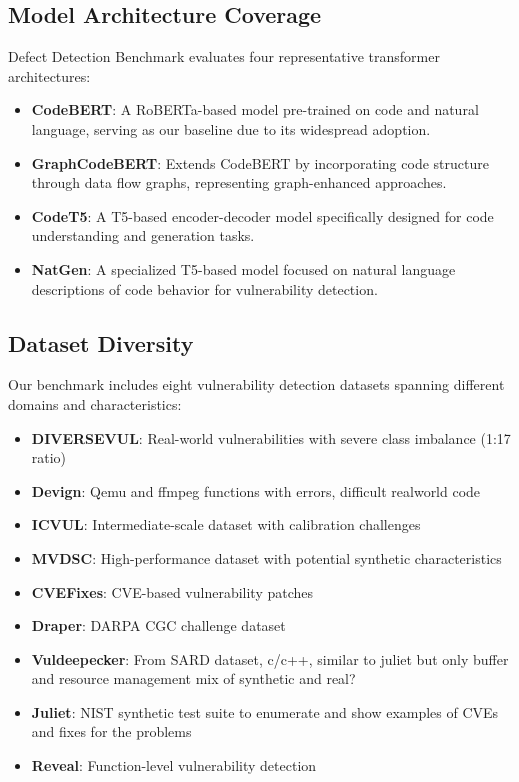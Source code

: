 \documentclass[letterpaper]{article}
\begin{document}
\subsection{Model Architecture Coverage}
Defect Detection Benchmark evaluates four representative transformer architectures:

\begin{itemize}
	\item \textbf{CodeBERT}: A RoBERTa-based model pre-trained on code and natural language, serving as our baseline due to its widespread adoption.

	\item \textbf{GraphCodeBERT}: Extends CodeBERT by incorporating code structure through data flow graphs, representing graph-enhanced approaches.

	\item \textbf{CodeT5}: A T5-based encoder-decoder model specifically designed for code understanding and generation tasks.

	\item \textbf{NatGen}: A specialized T5-based model focused on natural language descriptions of code behavior for vulnerability detection.
\end{itemize}

\subsection{Dataset Diversity}
Our benchmark includes eight vulnerability detection datasets spanning different domains and characteristics:
\begin{itemize}
	\item \textbf{DIVERSEVUL}: Real-world vulnerabilities with severe class imbalance (1:17 ratio)
	\item \textbf{Devign}: Qemu and ffmpeg functions with errors, difficult realworld code
	\item \textbf{ICVUL}: Intermediate-scale dataset with calibration challenges
	\item \textbf{MVDSC}: High-performance dataset with potential synthetic characteristics
	\item \textbf{CVEFixes}: CVE-based vulnerability patches
	\item \textbf{Draper}: DARPA CGC challenge dataset
	\item \textbf{Vuldeepecker}: From SARD dataset, c/c++, similar to juliet but only buffer and resource management mix of synthetic and real?
	\item \textbf{Juliet}: NIST synthetic test suite to enumerate and show examples of CVEs and fixes for the problems
	\item \textbf{Reveal}: Function-level vulnerability detection
\end{itemize}
\end{document}
